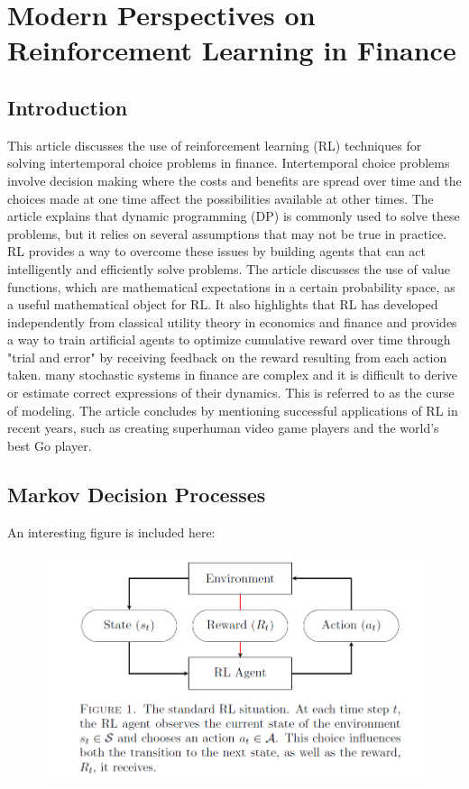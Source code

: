 \documentclass{article}
\begin{document}
\section{Modern Perspectives on Reinforcement Learning in Finance}
\subsection{Introduction}
This article discusses the use of reinforcement learning (RL) techniques for solving intertemporal choice problems in finance. Intertemporal choice problems involve decision making where the costs and benefits are spread over time and the choices made at one time affect the possibilities available at other times. The article explains that dynamic programming (DP) is commonly used to solve these problems, but it relies on several assumptions that may not be true in practice. RL provides a way to overcome these issues by building agents that can act intelligently and efficiently solve problems. The article discusses the use of value functions, which are mathematical expectations in a certain probability space, as a useful mathematical object for RL. It also highlights that RL has developed independently from classical utility theory in economics and finance and provides a way to train artificial agents to optimize cumulative reward over time through "trial and error" by receiving feedback on the reward resulting from each action taken. many stochastic systems in finance are complex and it is difficult to derive or estimate correct expressions of their dynamics. This is referred to as the curse of modeling. The article concludes by mentioning successful applications of RL in recent years, such as creating superhuman video game players and the world's best Go player.

\subsection{Markov Decision Processes}
An interesting figure is included here:
\begin{figure}[H]
\begin{center}
\includegraphics[scale = 0.5]{MDP.png}
\end{center}
\end{figure}
\end{document}
